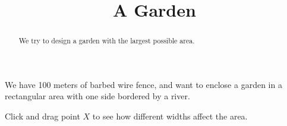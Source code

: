 \documentclass{ximera}
\title{A Garden}
\begin{document}
\begin{abstract}
We try to design a garden with the largest possible area.
\end{abstract}

We have 100 meters of barbed wire fence, and want to enclose a garden in a rectangular area with one side bordered by a river.

Click and drag point $X$ to see how different widths affect the area.

\end{document}
